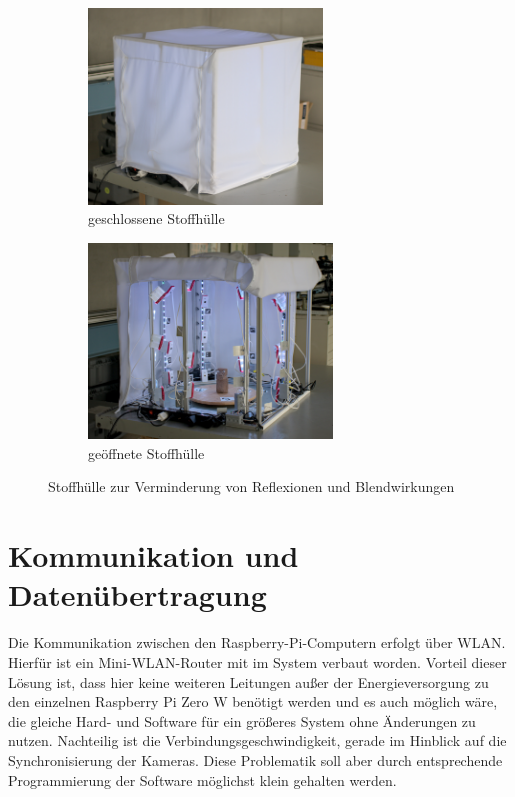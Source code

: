 \documentclass[./00PhotoBox.tex]{subfiles}
\begin{document}
\begin{figure}[htbp]
    \centering
    \begin{subfigure}{0.45\textwidth}
        \includegraphics[height=5.2cm]{./img/3_aufbau/stoffhuelle.jpg}
        \centering
        \caption{geschlossene Stoffhülle}
        \label{img:stoffhuelle}
    \end{subfigure}
    \begin{subfigure}{0.45\textwidth}
        \includegraphics[height=5.2cm]{./img/3_aufbau/stoffhuelle_offen.jpg}
        \centering
        \caption{geöffnete Stoffhülle}
        \label{img:stoffhuelle_offen}
    \end{subfigure}
    \caption{Stoffhülle zur Verminderung von Reflexionen und Blendwirkungen}
\end{figure}

\section{Kommunikation und Datenübertragung}
Die Kommunikation zwischen den Raspberry-Pi-Computern erfolgt über WLAN. Hierfür ist ein Mini-WLAN-Router mit im System verbaut worden. Vorteil dieser Lösung ist, dass hier keine weiteren Leitungen außer der Energieversorgung zu den einzelnen Raspberry Pi Zero W benötigt werden und es auch möglich wäre, die gleiche Hard- und Software für ein größeres System ohne Änderungen zu nutzen. Nachteilig ist die Verbindungsgeschwindigkeit, gerade im Hinblick auf die Synchronisierung der Kameras. Diese Problematik soll aber durch entsprechende Programmierung der Software möglichst klein gehalten werden.
\end{document}
